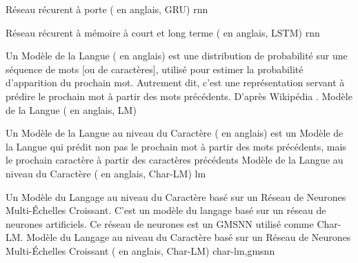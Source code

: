 {%
}{Réseau récurent à porte ( en anglais, GRU)}
{rnn}

{%
}{Réseau récurent à mémoire à court et long terme ( en anglais, LSTM)}
{rnn}

{%
	Un Modèle de la Langue ( en anglais) est une \og distribution de probabilité sur une séquence de mots [ou de caractères]\fg{}, 
	utilisé pour estimer la probabilité d'apparition du prochain mot.
	Autrement dit, c'est une représentation servant à prédire le prochain mot à partir des mots précédents. D'après Wikipédia \cite{wiki_lm}.
}{Modèle de la Langue ( en anglais, LM)}

{%
	{Un Modèle de la Langue au niveau du Caractère ( en anglais) est un Modèle de la Langue qui prédit non pas le prochain mot à partir des mots précédents, mais le prochain caractère à partir des caractères précédents}
}{Modèle de la Langue au niveau du Caractère ( en anglais, Char-LM)}
{lm}

{%
	Un Modèle du Langage au niveau du Caractère basé sur un Réseau de Neurones 
	Multi-Échelles Croissant. C'est un modèle du langage basé sur un réseau de 
	neurones artificiels. Ce réseau de neurones est un GMSNN utilisé comme Char-LM.}
{Modèle du Langage au niveau du Caractère basé sur un Réseau de Neurones Multi-Échelles Croissant ( en anglais, Char-LM)}
{char-lm,gmsnn}


